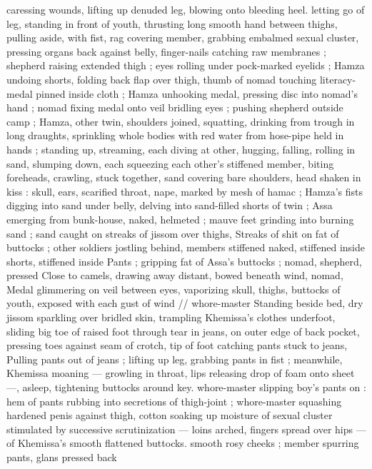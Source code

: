 {caressing wounds, lifting up denuded leg, blowing onto bleeding 
heel. letting go of leg, standing in front of youth, thrusting long 
smooth hand between thighs, pulling aside, with fist, rag covering 
member, grabbing embalmed sexual cluster, pressing organs back 
against belly, finger-nails catching raw membranes ; shepherd raising 
extended thigh ; eyes rolling under pock-marked eyelids ; Hamza 
undoing shorts, folding back flap over thigh, thumb of nomad 
touching literacy-medal pinned inside cloth ; Hamza unhooking 
medal, pressing disc into nomad's hand ; nomad fixing medal onto 
veil bridling eyes ; pushing shepherd outside camp ; Hamza, other 
twin, shoulders joined, squatting, drinking from trough in long 
draughts, sprinkling whole bodies with red water from hose-pipe held 
in hands ; standing up, streaming, each diving at other, hugging, 
falling, rolling in sand, slumping down, each squeezing each other's 
stiffened member, biting foreheads, crawling, stuck together, sand 
covering bare shoulders, head shaken in kiss : skull, ears, scarified 
throat, nape, marked by mesh of hamac ; Hamza's fists digging into 
sand under belly, delving into sand-filled shorts of twin ; Assa 
emerging from bunk-house, naked, helmeted ; mauve feet grinding 
into burning sand ; sand caught on streaks of jissom over thighs, 
Streaks of shit on fat of buttocks ; other soldiers jostling behind, 
members stiffened naked, stiffened inside shorts, stiffened inside 
Pants ; gripping fat of Assa's buttocks ; nomad, shepherd, pressed 
Close to camels, drawing away distant, bowed beneath wind, nomad, 
Medal glimmering on veil between eyes, vaporizing skull, thighs, 
buttocks of youth, exposed with each gust of wind {\slash}{\slash} whore-master 
Standing beside bed, dry jissom sparkling over bridled skin, 
trampling Khemissa's clothes underfoot, sliding big toe of raised foot 
through tear in jeans, on outer edge of back pocket, pressing toes 
against seam of crotch, tip of foot catching pants stuck to jeans, 
Pulling pants out of jeans ; lifting up leg, grabbing pants in fist ; 
meanwhile, Khemissa moaning --- growling in throat, lips releasing 
drop of foam onto sheet ---, asleep, tightening buttocks around key. 
whore-master slipping boy's pants on : hem of pants rubbing into 
secretions of thigh-joint ; whore-master squashing hardened penis 
against thigh, cotton soaking up moisture of sexual cluster 
stimulated by successive scrutinization --- loins arched, fingers 
spread over hips --- of Khemissa's smooth flattened buttocks. 
smooth rosy cheeks ; member spurring pants, glans pressed back 
}
